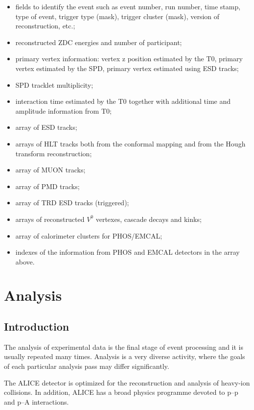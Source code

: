 \documentclass[12pt,a4paper,twoside]{article}
\makeatletter
\newcommand {\pp} {\mbox{p--p}\@\xspace}
\newcommand {\pA} {\mbox{p--A}\@\xspace}
\makeatother
\begin{document}
\begin{itemize}
\item fields to identify the event such as event number, run number,
  time stamp, type of event, trigger type (mask), trigger cluster (mask),
  version of reconstruction, etc.;
\item reconstructed ZDC energies and number of participant;
\item primary vertex information: vertex z position estimated by the T0,
  primary vertex estimated by the SPD, primary vertex estimated using
  ESD tracks;
\item SPD tracklet multiplicity;
\item interaction time estimated by the T0 together with additional
  time and amplitude information from T0;
\item array of ESD tracks;
\item arrays of HLT tracks both from the conformal mapping and from
  the Hough transform reconstruction;
\item array of MUON tracks;
\item array of PMD tracks;
\item array of TRD ESD tracks (triggered);
\item arrays of reconstructed $V^0$ vertexes, cascade decays and
  kinks;
\item array of calorimeter clusters for PHOS/EMCAL;
\item indexes of the information from PHOS and EMCAL detectors in the
  array above.
\end{itemize}


\newpage
\section{Analysis}


\subsection{Introduction}
The analysis of experimental data is the final stage of event
processing and it is usually repeated many times. Analysis is a very diverse
activity, where the goals of each
particular analysis pass may differ significantly.

The ALICE detector \cite{PPR} is optimized for the
reconstruction and analysis of heavy-ion collisions. 
In addition, ALICE has a broad physics programme devoted to
\pp and \pA interactions. 
\end{document}
